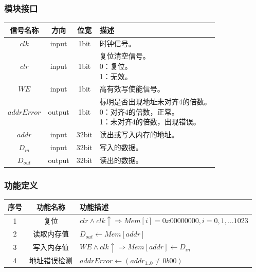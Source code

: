 \documentclass[main.tex]{subfiles}
\begin{document}
\subsubsection{模块接口}
\begin{center}
    \begin{tabular}[]{c c c l}
        \toprule
        信号名称 & 方向 & 位宽 & 描述 \\
        \midrule
        $clk$ & input & 1bit & 时钟信号。\\
        $clr$ & input & 1bit & \makecell[lt]{
            复位清空信号。\\
             0：复位。\\
             1：无效。
        } \\
        $WE$ & input & 1bit & 高有效写使能信号。\\
        $addrError$ & output & 1bit & \makecell[lt]{
            标明是否出现地址未对齐4的倍数。\\
             0：对齐4的倍数，正常。 \\
             1：未对齐4的倍数，出现错误。
        } \\
        \midrule
        $addr$ & input & 32bit & 读出或写入内存的地址。\\
        $D_{in}$ & input & 32bit & 写入的数据。 \\
        $D_{out}$ & output & 32bit & 读出的数据。\\
        \bottomrule
    \end{tabular}
\end{center}

\subsubsection{功能定义}
\begin{center}
    \begin{tabular}{c c l}
        \toprule
        序号 & 功能名称 & 功能描述 \\
        \midrule
        1 & 复位 & $clr \land clk\uparrow \Rightarrow  Mem[i] = 0x00000000, i=0, 1, \dots 1023 $ \\
        2 & 读取内存值 & $ D_{out} \leftarrow Mem[addr] $ \\
        3 & 写入内存值 & $ WE \land clk\uparrow \Rightarrow Mem[addr] \leftarrow D_{in}$ \\
        4 & 地址错误检测 & $addrError \leftarrow \left( addr_{1..0} \neq 0b00 \right)$ \\
        \bottomrule
    \end{tabular}
\end{center}
\end{document}

